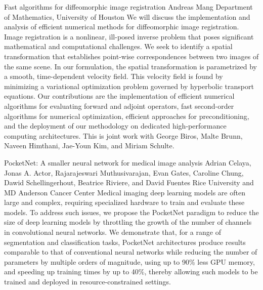 \begin{addmargin}[2em]{0em}
\vspace{1.5ex}
\abs
{Fast algorithms for diffeomorphic image registration}
{Andreas Mang}
{Department of Mathematics, University of Houston}
{We will discuss the implementation and analysis of efficient numerical methods for diffeomorphic image registration. Image registration is a nonlinear, ill-posed inverse problem that poses significant mathematical and computational challenges. We seek to identify a spatial transformation that establishes point-wise correspondences between two images of the same scene. In our formulation, the spatial transformation is parametrized by a smooth, time-dependent velocity field. This velocity field is found by minimizing a variational optimization problem governed by hyperbolic transport equations. Our contributions are the implementation of efficient numerical algorithms for evaluating forward and adjoint operators, fast second-order algorithms for numerical optimization, efficient approaches for preconditioning, and the deployment of our methodology on dedicated high-performance computing architectures. This is joint work with George Biros, Malte Brunn, Naveen Himthani, Jae-Youn Kim, and Miriam Schulte.}


\vspace{1.5ex}
\abs
{PocketNet: A smaller neural network for medical image analysis}
{Adrian Celaya, Jonas A. Actor, Rajarajeswari Muthusivarajan, Evan
Gates, Caroline Chung, Dawid Schellingerhout, Beatrice Riviere, and
David Fuentes}
{Rice University and MD Anderson Cancer Center}
{Medical imaging deep learning models are often large and complex,
requiring specialized hardware to train and evaluate these models. To
address such issues, we propose the PocketNet paradigm to reduce the
size of deep learning models by throttling the growth of the number of
channels in convolutional neural networks. We demonstrate that, for a
range of segmentation and classification tasks, PocketNet
architectures produce results comparable to that of conventional
neural networks while reducing the number of parameters by multiple
orders of magnitude, using up to 90\% less GPU memory, and speeding up
training times by up to 40\%, thereby allowing such models to be
trained and deployed in resource-constrained settings.}



\end{addmargin}
